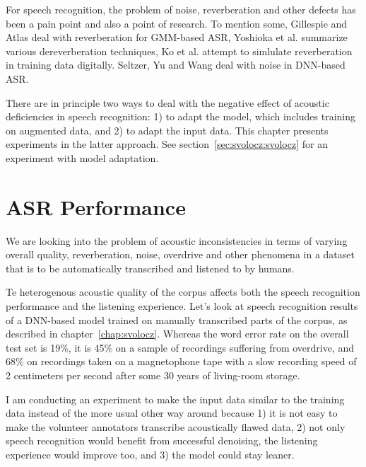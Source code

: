 \documentclass[12pt,a4paper]{report}
\begin{document}
For speech recognition, the problem of noise, reverberation and other defects
has been a pain point and also a point of research. To mention some, Gillespie
and Atlas\cite{gillespie2002diversity} deal with reverberation for
GMM-based ASR, Yoshioka et al.\cite{reverbmagazine} summarize various
dereverberation techniques, Ko et al.\cite{reverbaugment} attempt to
simlulate reverberation in training data digitally. Seltzer, Yu and
Wang\cite{dnnnoiserobust} deal with noise in DNN-based ASR.

There are in principle two ways to deal with the negative effect of acoustic
deficiencies in speech recognition: 1) to adapt the model, which includes
training on augmented data, and 2) to adapt the input data. This chapter
presents experiments in the latter approach. See
section~\ref{sec:svolocz:svolocz} for an experiment with model adaptation.

\section{ASR Performance}

We are looking into the problem of acoustic inconsistencies in terms of varying
overall quality, reverberation, noise, overdrive and other phenomena in a
dataset that is to be automatically transcribed and listened to by humans.

Te heterogenous acoustic quality of the corpus affects both the speech recognition
performance and the listening experience. Let's look at speech recognition results
of a DNN-based model trained on manually transcribed parts of the corpus, as  described in chapter~\ref{chap:svolocz}. Whereas the word error rate on the
overall test set is 19\%, it is 45\% on a sample of recordings suffering from
overdrive, and 68\% on recordings taken on a magnetophone tape with a slow
recording speed of 2 centimeters per second after some 30 years of living-room
storage.

I am conducting an experiment to make the input data similar to the training
data instead of the more usual other way around because 1) it is not easy to
make the volunteer annotators transcribe acoustically flawed data, 2) not only
speech recognition would benefit from successful denoising, the listening
experience would improve too, and 3) the model could stay leaner.
\end{document}
